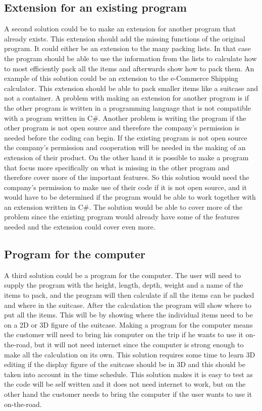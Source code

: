 \subsection{Extension for an existing program}
A second solution could be to make an extension for another program that already exists. This extension should add the missing functions of the original program. It could either be an extension to the many packing lists. In that case the program should be able to use the information from the lists to calculate how to most efficiently pack all the items and afterwards show how to pack them. An example of this solution could be an extension to the e-Commerce Shipping calculator. This extension should be able to pack smaller items like a suitcase and not a container. A problem with making an extension for another program is if the other program is written in a programming language that is not compatible with a program written in C\#. Another problem is writing the program if the other program is not open source and therefore the company's permission is needed before the coding can begin. If the existing program is not open source the company's permission and cooperation will be needed in the making of an extension of their product. On the other hand it is possible to make a program that focus more specifically on what is missing in the other program and therefore cover more of the important features. So this solution would need the company's permission to make use of their code if it is not open source, and it would have to be determined if the program would be able to work together with an extension written in C\#. The solution would be able to cover more of the problem since the existing program would already have some of the features needed and the extension could cover even more.

\subsection{Program for the computer}
A third solution could be a program for the computer. The user will need to supply the program with the height, length, depth, weight and a name of the items to pack, and the program will then calculate if all the items can be packed and where in the suitcase. After the calculation the program will show where to put all the items. This will be by showing where the individual items need to be on a 2D or 3D figure of the suitcase. Making a program for the computer means the customer will need to bring his computer on the trip if he wants to use it on-the-road, but it will not need internet since the computer is strong enough to make all the calculation on its own. This solution requires some time to learn 3D editing if the display figure of the suitcase should be in 3D and this should be taken into account in the time schedule. This solution makes it is easy to test as the code will be self written and it does not need internet to work, but on the other hand the customer needs to bring the computer if the user wants to use it on-the-road.

